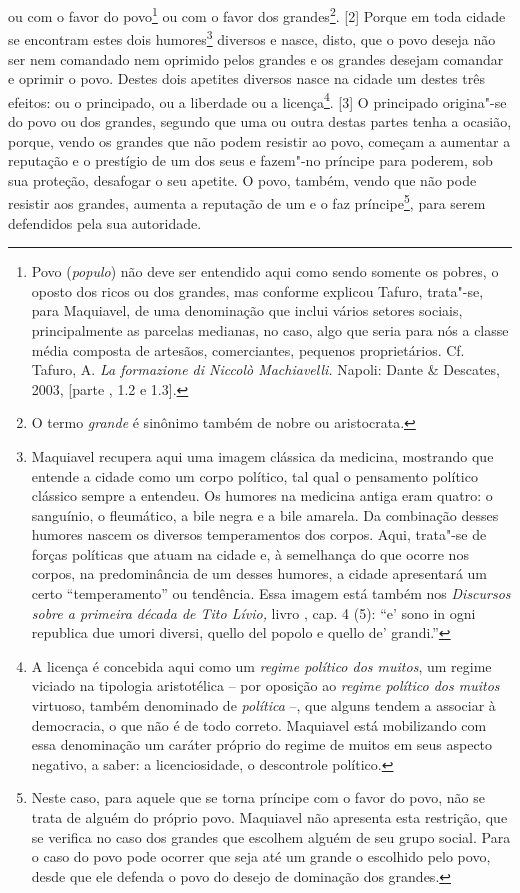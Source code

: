 ou com o favor do povo\footnote{Povo (\emph{populo}) não deve ser
  entendido aqui como sendo somente os pobres, o oposto dos ricos ou dos
  grandes, mas conforme explicou Tafuro, trata"-se, para Maquiavel, de
  uma denominação que inclui vários setores sociais, principalmente as
  parcelas medianas, no caso, algo que seria para nós a classe média
  composta de artesãos, comerciantes, pequenos proprietários. Cf.
  Tafuro, A. \emph{La formazione di Niccolò Machiavelli.} Napoli: Dante
  \& Descates, 2003, {[}parte , 1.2 e 1.3{]}.} ou com o favor dos
grandes\footnote{O termo \emph{grande} é sinônimo também de nobre ou
  aristocrata.}. {[}2{]} Porque em toda cidade se encontram estes dois
humores\footnote{Maquiavel recupera aqui uma imagem clássica da
  medicina, mostrando que entende a cidade como um corpo político, tal
  qual o pensamento político clássico sempre a entendeu. Os humores na
  medicina antiga eram quatro: o sanguínio, o fleumático, a bile negra e
  a bile amarela. Da combinação desses humores nascem os diversos
  temperamentos dos corpos. Aqui, trata"-se de forças políticas que atuam
  na cidade e, à semelhança do que ocorre nos corpos, na predominância
  de um desses humores, a cidade apresentará um certo ``temperamento''
  ou tendência. Essa imagem está também nos \emph{Discursos sobre a
  primeira década de Tito Lívio,} livro , cap. 4 (5): ``e' sono in ogni
  republica due umori diversi, quello del popolo e quello de' grandi.''}
diversos e nasce, disto, que o povo deseja não ser nem comandado nem
oprimido pelos grandes e os grandes desejam comandar e oprimir o povo.
Destes dois apetites diversos nasce na cidade um destes três efeitos: ou
o principado, ou a liberdade ou a licença\footnote{A licença é concebida aqui como um \emph{regime político dos muitos}, um regime viciado na tipologia aristotélica -- por oposição ao \emph{regime político dos muitos} virtuoso, também denominado de \emph{política} --, que alguns tendem a associar à democracia, o que não é de todo correto. Maquiavel está mobilizando com essa denominação um caráter próprio do regime de muitos em seus aspecto negativo, a saber: a licenciosidade, o descontrole político.}. {[}3{]} O principado origina"-se do povo ou dos
grandes, segundo que uma ou outra destas partes tenha a ocasião, porque,
vendo os grandes que não podem resistir ao povo, começam a aumentar a
reputação e o prestígio de um dos seus e fazem"-no príncipe para poderem,
sob sua proteção, desafogar o seu apetite. O povo, também, vendo que não
pode resistir aos grandes, aumenta a reputação de um e o faz
príncipe\footnote{Neste caso, para aquele que se torna príncipe com o
  favor do povo, não se trata de alguém do próprio povo. Maquiavel não
  apresenta esta restrição, que se verifica no caso dos grandes que
  escolhem alguém de seu grupo social. Para o caso do povo pode ocorrer
  que seja até um grande o escolhido pelo povo, desde que ele defenda o
  povo do desejo de dominação dos grandes.}, para serem defendidos pela
sua autoridade.

